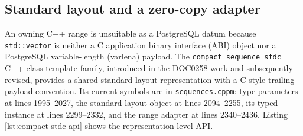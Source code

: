 \subsection{Standard layout and a zero-copy adapter}

An owning C++ range is unsuitable as a PostgreSQL datum because
\texttt{std::vector} is neither a C application binary interface (ABI) object
nor a PostgreSQL variable-length (varlena) payload.  The
\texttt{compact\_sequence\_stdc} C++ class-template family, introduced in the
DOC0258 work and subsequently revised, provides a shared standard-layout
representation with a C-style trailing-payload convention.  Its current
symbols are in \texttt{sequences.cppm}: type parameters at lines 1995--2027,
the standard-layout object at lines 2094--2255, its typed instance at lines
2299--2332, and the range adapter at lines 2340--2436.  Listing
\ref{lst:compact-stdc-api} shows the representation-level API.


